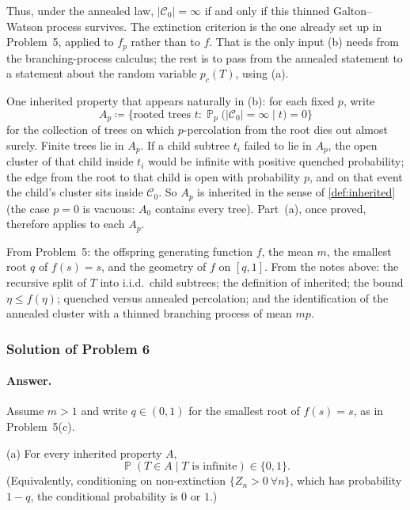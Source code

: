 \documentclass[11pt,a4paper]{article}
\DeclareMathOperator{\Pbb}{\mathbb{P}}
\begin{document}
Thus, under the annealed law, \(|\mathcal{C}_0|=\infty\) if and only if this thinned Galton--Watson process survives. The extinction criterion is the one already set up in Problem~5, applied to \(f_p\) rather than to \(f\). That is the only input (b) needs from the branching-process calculus; the rest is to pass from the annealed statement to a statement about the random variable \(p_c(T)\), using (a).

One inherited property that appears naturally in (b): for each fixed \(p\), write
\[
A_p
\coloneqq
\bigl\{\text{rooted trees }t:\Pbb_p\bigl(|\mathcal{C}_0|=\infty\mid t\bigr)=0\bigr\}
\]
for the collection of trees on which \(p\)-percolation from the root dies out almost surely. Finite trees lie in \(A_p\). If a child subtree \(t_i\) failed to lie in \(A_p\), the open cluster of that child inside \(t_i\) would be infinite with positive quenched probability; the edge from the root to that child is open with probability \(p\), and on that event the child's cluster sits inside \(\mathcal{C}_0\). So \(A_p\) is inherited in the sense of \cref{def:inherited} (the case \(p=0\) is vacuous: \(A_0\) contains every tree). Part~(a), once proved, therefore applies to each \(A_p\).

\begin{remark}
\label{rem:p6-toolkit}
From Problem~5: the offspring generating function \(f\), the mean \(m\), the smallest root \(q\) of \(f(s)=s\), and the geometry of \(f\) on \([q,1]\). From the notes above: the recursive split of \(T\) into i.i.d.\ child subtrees; the definition of inherited; the bound \(\eta\le f(\eta)\); quenched versus annealed percolation; and the identification of the annealed cluster with a thinned branching process of mean \(mp\).
\end{remark}

\subsubsection{Solution of Problem 6}

\paragraph{Answer.}

Assume \(m>1\) and write \(q\in(0,1)\) for the smallest root of \(f(s)=s\), as in Problem~5(c).

(a) For every inherited property \(A\),
\[
\Pbb(T\in A\mid T\text{ is infinite})
\in\{0,1\}.
\]
(Equivalently, conditioning on non-extinction \(\{Z_n>0\ \forall n\}\), which has probability \(1-q\), the conditional probability is \(0\) or \(1\).)
\end{document}

